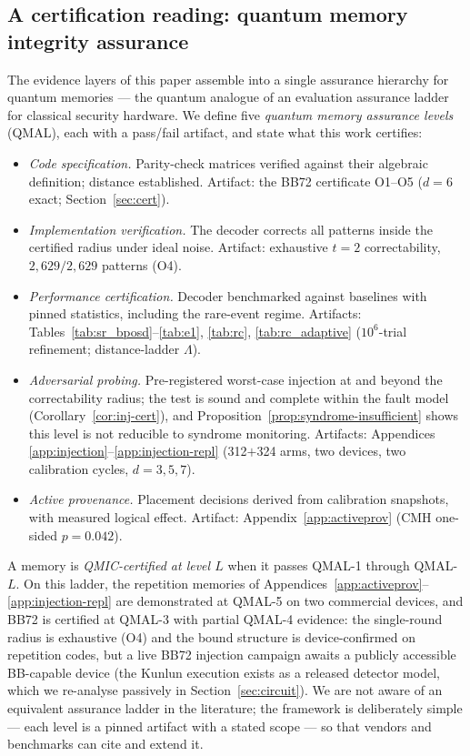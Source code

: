\documentclass[11pt,a4paper]{article}
\begin{document}
\subsection{A certification reading: quantum memory integrity assurance}
\label{ssec:qmic}

The evidence layers of this paper assemble into a single assurance
hierarchy for quantum memories --- the quantum analogue of an
evaluation assurance ladder for classical security hardware. We define
five \emph{quantum memory assurance levels} (QMAL), each with a
pass/fail artifact, and state what this work certifies:

\begin{itemize}[leftmargin=1.6em,itemsep=1pt,topsep=2pt]
\item[QMAL-1] \emph{Code specification.} Parity-check matrices verified
  against their algebraic definition; distance established. Artifact:
  the BB72 certificate O1--O5 ($d=6$ exact;
  Section~\ref{sec:cert}).
\item[QMAL-2] \emph{Implementation verification.} The decoder corrects
  all patterns inside the certified radius under ideal noise. Artifact:
  exhaustive $t=2$ correctability, $2{,}629/2{,}629$ patterns (O4).
\item[QMAL-3] \emph{Performance certification.} Decoder benchmarked
  against baselines with pinned statistics, including the rare-event
  regime. Artifacts: Tables~\ref{tab:sr_bposd}--\ref{tab:e1},
  \ref{tab:rc}, \ref{tab:rc_adaptive} ($10^{6}$-trial refinement;
  distance-ladder $\Lambda$).
\item[QMAL-4] \emph{Adversarial probing.} Pre-registered worst-case
  injection at and beyond the correctability radius; the test is sound
  and complete within the fault model
  (Corollary~\ref{cor:inj-cert}), and
  Proposition~\ref{prop:syndrome-insufficient} shows this level is not
  reducible to syndrome monitoring. Artifacts: Appendices~
  \ref{app:injection}--\ref{app:injection-repl} (312$+$324 arms, two
  devices, two calibration cycles, $d=3,5,7$).
\item[QMAL-5] \emph{Active provenance.} Placement decisions derived
  from calibration snapshots, with measured logical effect. Artifact:
  Appendix~\ref{app:activeprov} (CMH one-sided $p=0.042$).
\end{itemize}

A memory is \emph{QMIC-certified at level $L$} when it passes QMAL-1
through QMAL-$L$. On this ladder, the repetition memories of
Appendices~\ref{app:activeprov}--\ref{app:injection-repl} are
demonstrated at QMAL-5 on two commercial devices, and BB72 is certified
at QMAL-3 with partial QMAL-4 evidence: the single-round radius is
exhaustive (O4) and the bound structure is device-confirmed on
repetition codes, but a live BB72 injection campaign awaits a publicly
accessible BB-capable device (the Kunlun execution exists as a released
detector model, which we re-analyse passively in
Section~\ref{sec:circuit}). We are not aware of an equivalent
assurance ladder in the literature; the framework is deliberately
simple --- each level is a pinned artifact with a stated scope --- so
that vendors and benchmarks can cite and extend it.
\end{document}
